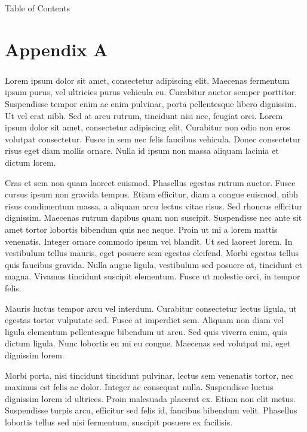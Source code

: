\documentclass[./main]{subfiles}
\begin{document}
\appendix

\begin{frame}{Table of Contents}
    \tableofcontents[hideallsubsections,firstsection=3]
\end{frame}




\section[App A]{Appendix A}
\begin{frame}[allowframebreaks]
  \frametitle{\secname}

  Lorem ipsum dolor sit amet, consectetur adipiscing elit. Maecenas fermentum ipsum purus, vel ultricies purus vehicula eu. Curabitur auctor semper porttitor. Suspendisse tempor enim ac enim pulvinar, porta pellentesque libero dignissim. Ut vel erat nibh. Sed at arcu rutrum, tincidunt nisi nec, feugiat orci. Lorem ipsum dolor sit amet, consectetur adipiscing elit. Curabitur non odio non eros volutpat consectetur. Fusce in sem nec felis faucibus vehicula. Donec consectetur risus eget diam mollis ornare. Nulla id ipsum non massa aliquam lacinia et dictum lorem.

  Cras et sem non quam laoreet euismod. Phasellus egestas rutrum auctor. Fusce cursus ipsum non gravida tempus. Etiam efficitur, diam a congue euismod, nibh risus condimentum massa, a aliquam arcu lectus vitae risus. Sed rhoncus efficitur dignissim. Maecenas rutrum dapibus quam non suscipit. Suspendisse nec ante sit amet tortor lobortis bibendum quis nec neque. Proin ut mi a lorem mattis venenatis. Integer ornare commodo ipsum vel blandit. Ut sed laoreet lorem. In vestibulum tellus mauris, eget posuere sem egestas eleifend. Morbi egestas tellus quis faucibus gravida. Nulla augue ligula, vestibulum sed posuere at, tincidunt et magna. Vivamus tincidunt suscipit elementum. Fusce ut molestie orci, in tempor felis.

  Mauris luctus tempor arcu vel interdum. Curabitur consectetur lectus ligula, ut egestas tortor vulputate sed. Fusce at imperdiet sem. Aliquam non diam vel ligula elementum pellentesque bibendum ut arcu. Sed quis viverra enim, quis dictum ligula. Nunc lobortis eu mi eu congue. Maecenas sed volutpat mi, eget dignissim lorem.

  Morbi porta, nisi tincidunt tincidunt pulvinar, lectus sem venenatis tortor, nec maximus est felis ac dolor. Integer ac consequat nulla. Suspendisse luctus dignissim lorem id ultrices. Proin malesuada placerat ex. Etiam non elit metus. Suspendisse turpis arcu, efficitur sed felis id, faucibus bibendum velit. Phasellus lobortis tellus sed nisi fermentum, suscipit posuere ex facilisis.


\end{frame}
\end{document}
